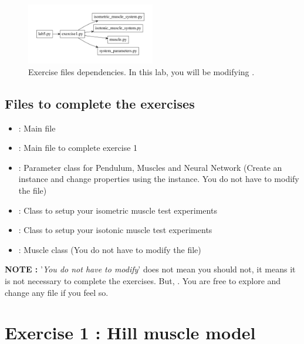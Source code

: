 \documentclass{cmc}
\begin{document}

\begin{figure}[ht]
  \centering \includegraphics[width=0.5\textwidth]{figures/files}
  \caption{\label{fig:files} Exercise files dependencies. In this
  lab, you will be modifying .}
\end{figure}

\subsection*{Files to complete the exercises}
\label{sec:intro}

\begin{itemize}
\item {} : Main file
\item {} : Main file to complete exercise 1
\item {} : Parameter class for Pendulum,
  Muscles and Neural Network (Create an instance and change properties
  using the instance. You do not have to modify the file)
\item {} : Class to setup your
  isometric muscle test experiments
\item {} : Class to setup your
  isotonic muscle test experiments
\item {} : Muscle class (You do not have to modify
  the file)
\end{itemize}

\textbf{NOTE : } '\textit{You do not have to modify}' does not mean
you should not, it means it is not necessary to complete the
exercises. But, . You are free to explore
and change any file if you feel so.
\clearpage

\section*{Exercise 1 : Hill muscle model}
\label{sec:question-2}
\end{document}

